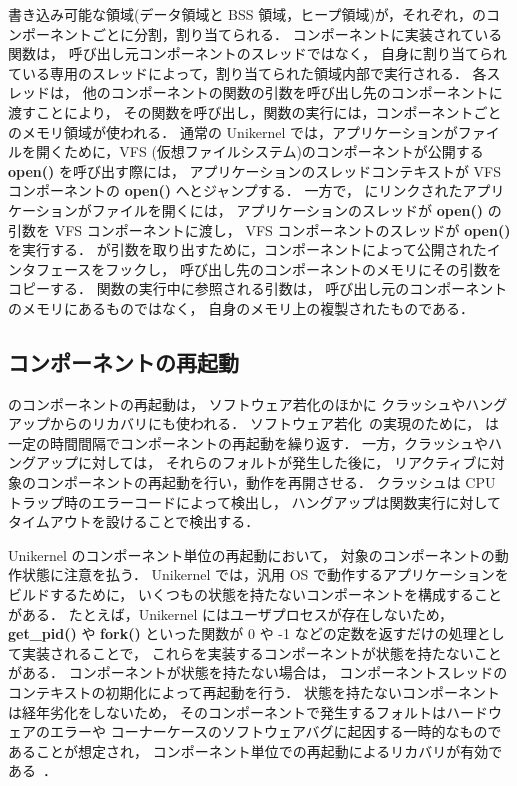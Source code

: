 書き込み可能な領域(データ領域と BSS 領域，ヒープ領域)が，それぞれ，\sysname のコンポーネントごとに分割，割り当てられる．
コンポーネントに実装されている関数は，
呼び出し元コンポーネントのスレッドではなく，
自身に割り当てられている専用のスレッドによって，割り当てられた領域内部で実行される．
各スレッドは，
他のコンポーネントの関数の引数を呼び出し先のコンポーネントに渡すことにより，
その関数を呼び出し，関数の実行には，コンポーネントごとのメモリ領域が使われる．
通常の Unikernel では，アプリケーションがファイルを開くために，VFS (仮想ファイルシステム)のコンポーネントが公開する \textbf{open()} を呼び出す際には，
アプリケーションのスレッドコンテキストが VFS コンポーネントの \textbf{open()} へとジャンプする．
一方で， \sysname にリンクされたアプリケーションがファイルを開くには，
アプリケーションのスレッドが \textbf{open()} の引数を VFS コンポーネントに渡し，
VFS コンポーネントのスレッドが \textbf{open()} を実行する．
\sysname が引数を取り出すために，コンポーネントによって公開されたインタフェースをフックし，
呼び出し先のコンポーネントのメモリにその引数をコピーする．
関数の実行中に参照される引数は，
呼び出し元のコンポーネントのメモリにあるものではなく，
自身のメモリ上の複製されたものである．


\subsection{コンポーネントの再起動}


\sysname のコンポーネントの再起動は，
ソフトウェア若化のほかに
クラッシュやハングアップからのリカバリにも使われる．
ソフトウェア若化~\cite{HuangEtAl-rejuvenation,CotroneoEtAl-rejuvenation-survey,CotroneoEtAl-Surv14}の実現のために，
\sysname は一定の時間間隔でコンポーネントの再起動を繰り返す．
一方，クラッシュやハングアップに対しては，
それらのフォルトが発生した後に，
リアクティブに対象のコンポーネントの再起動を行い，動作を再開させる．
クラッシュは CPU トラップ時のエラーコードによって検出し，
ハングアップは関数実行に対してタイムアウトを設けることで検出する．


Unikernel のコンポーネント単位の再起動において，
対象のコンポーネントの動作状態に注意を払う．
Unikernel では，汎用 OS で動作するアプリケーションをビルドするために，
いくつもの状態を持たないコンポーネントを構成することがある．
たとえば，Unikernel にはユーザプロセスが存在しないため，
\textbf{get\_pid()} や \textbf{fork()}
といった関数が 0 や -1 などの定数を返すだけの処理として実装されることで，
これらを実装するコンポーネントが状態を持たないことがある．
コンポーネントが状態を持たない場合は，
コンポーネントスレッドのコンテキストの初期化によって再起動を行う．
状態を持たないコンポーネントは経年劣化をしないため，
そのコンポーネントで発生するフォルトはハードウェアのエラーや
コーナーケースのソフトウェアバグに起因する一時的なものであることが想定され，
コンポーネント単位での再起動によるリカバリが有効である~\cite{BhatEtAl-OSIRIS}．


